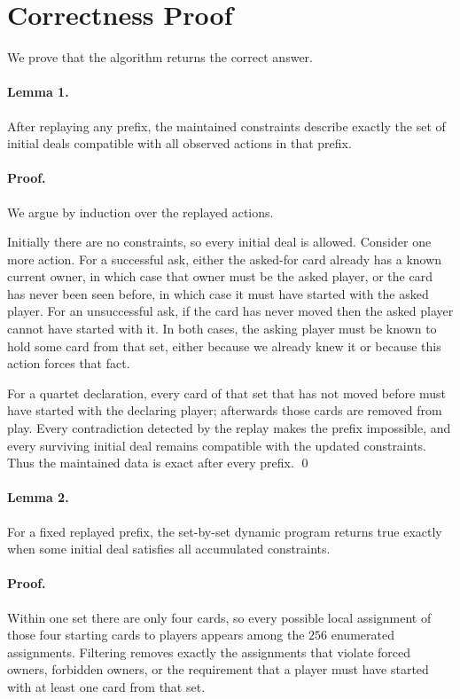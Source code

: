 \documentclass[11pt]{article}
\begin{document}
\section*{Correctness Proof}

We prove that the algorithm returns the correct answer.

\paragraph{Lemma 1.}
After replaying any prefix, the maintained constraints describe exactly the set of initial deals
compatible with all observed actions in that prefix.

\paragraph{Proof.}
We argue by induction over the replayed actions.

Initially there are no constraints, so every initial deal is allowed. Consider one more action.
For a successful ask, either the asked-for card already has a known current owner, in which case
that owner must be the asked player, or the card has never been seen before, in which case it must
have started with the asked player. For an unsuccessful ask, if the card has never moved then the
asked player cannot have started with it. In both cases, the asking player must be known to hold
some card from that set, either because we already knew it or because this action forces that fact.

For a quartet declaration, every card of that set that has not moved before must have started with
the declaring player; afterwards those cards are removed from play. Every contradiction detected by
the replay makes the prefix impossible, and every surviving initial deal remains compatible with the
updated constraints. Thus the maintained data is exact after every prefix. \qed

\paragraph{Lemma 2.}
For a fixed replayed prefix, the set-by-set dynamic program returns true exactly when some initial
deal satisfies all accumulated constraints.

\paragraph{Proof.}
Within one set there are only four cards, so every possible local assignment of those four starting
cards to players appears among the $256$ enumerated assignments. Filtering removes exactly the
assignments that violate forced owners, forbidden owners, or the requirement that a player must
have started with at least one card from that set.
\end{document}
